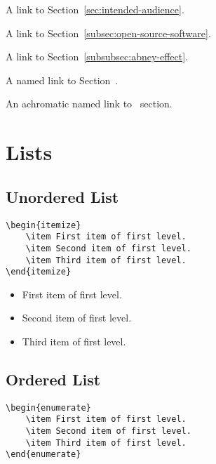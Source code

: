 A link to Section~\ref{sec:intended-audience}.

A link to Section~\ref{subsec:open-source-software}.

A link to Section~\ref{subsubsec:abney-effect}.

A named link to Section~.

An achromatic named link to~ section.

\section*{Lists}
\label{sec:lists}

\subsection*{Unordered List}
\label{subsec:unordered-list}

\begin{lstlisting}[caption={An unordered list.}]
\begin{itemize}
    \item First item of first level.
    \item Second item of first level.
    \item Third item of first level.
\end{itemize}
\end{lstlisting}

\begin{itemize}
    \item First item of first level.
    \item Second item of first level.
    \item Third item of first level.
\end{itemize}

\subsection*{Ordered List}
\label{subsec:ordered-list}

\begin{lstlisting}[caption={An ordered list.}]
\begin{enumerate}
    \item First item of first level.
    \item Second item of first level.
    \item Third item of first level.
\end{enumerate}
\end{lstlisting}

